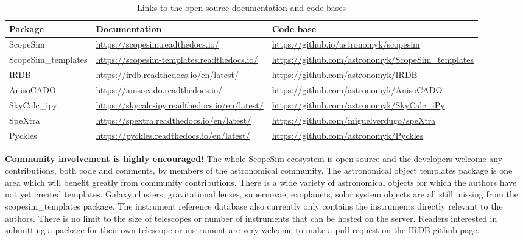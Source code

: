 \begin{table}
\caption{Links to the open source documentation and code bases}\label{tbl-list-of-packages}
\begin{tabularx}{\linewidth}{|l|X|X|}
\hline

Package
 & 
Documentation
 & 
Code base
 \\
\hline

ScopeSim
 & 
\url{https://scopesim.readthedocs.io/}
 & 
\url{https://github.io/astronomyk/scopesim}
 \\
\hline

ScopeSim\_templates
 & 
\url{https://scopesim-templates.readthedocs.io/}
 & 
\url{https://github.com/astronomyk/ScopeSim_templates}
 \\
\hline

IRDB
 & 
\url{https://irdb.readthedocs.io/en/latest/}
 & 
\url{https://github.com/astronomyk/IRDB}
 \\
\hline

AnisoCADO
 & 
\url{https://anisocado.readthedocs.io/}
 & 
\url{https://github.com/astronomyk/AnisoCADO}
 \\
\hline

SkyCalc\_ipy
 & 
\url{https://skycalc-ipy.readthedocs.io/en/latest/}
 & 
\url{https://github.com/astronomyk/SkyCalc_iPy}
 \\
\hline

SpeXtra
 & 
\url{https://spextra.readthedocs.io/en/latest/}
 & 
\url{https://github.com/miguelverdugo/speXtra}
 \\
\hline

Pyckles
 & 
\url{https://pyckles.readthedocs.io/en/latest/}
 & 
\url{https://github.com/astronomyk/Pyckles}
 \\
\hline
\end{tabularx}
\end{table}

\textbf{Community involvement is highly encouraged!}
The whole ScopeSim ecosystem is open source and the developers welcome any contributions, both code and comments, by members of the astronomical community.
The astronomical object templates package is one area which will benefit greatly from community contributions.
There is a wide variety of astronomical objects for which the authors have not yet created templates.
Galaxy clusters, gravitational lenses, supernovae, exoplanets, solar system objects are all still missing from the scopesim\_templates package.
The instrument reference database also currently only contains the instruments directly relevant to the authors.
There is no limit to the size of telescopes or number of instruments that can be hosted on the server.
Readers interested in submitting a package for their own telescope or instrument are very welcome to make a pull request on the IRDB github page.
